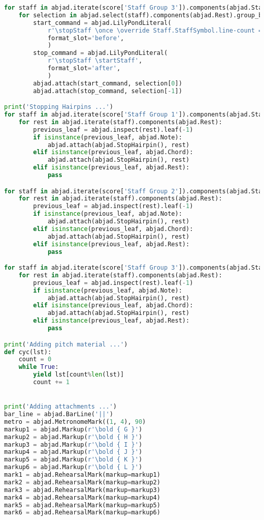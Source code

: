 \begin{lstlisting}[language=Python, caption=Tianshu Segment\_II]
for staff in abjad.iterate(score['Staff Group 3']).components(abjad.Staff):
    for selection in abjad.select(staff).components(abjad.Rest).group_by_contiguity():
        start_command = abjad.LilyPondLiteral(
            r'\stopStaff \once \override Staff.StaffSymbol.line-count = #1 \startStaff',
            format_slot='before',
            )
        stop_command = abjad.LilyPondLiteral(
            r'\stopStaff \startStaff',
            format_slot='after',
            )
        abjad.attach(start_command, selection[0])
        abjad.attach(stop_command, selection[-1])

print('Stopping Hairpins ...')
for staff in abjad.iterate(score['Staff Group 1']).components(abjad.Staff):
    for rest in abjad.iterate(staff).components(abjad.Rest):
        previous_leaf = abjad.inspect(rest).leaf(-1)
        if isinstance(previous_leaf, abjad.Note):
            abjad.attach(abjad.StopHairpin(), rest)
        elif isinstance(previous_leaf, abjad.Chord):
            abjad.attach(abjad.StopHairpin(), rest)
        elif isinstance(previous_leaf, abjad.Rest):
            pass

for staff in abjad.iterate(score['Staff Group 2']).components(abjad.Staff):
    for rest in abjad.iterate(staff).components(abjad.Rest):
        previous_leaf = abjad.inspect(rest).leaf(-1)
        if isinstance(previous_leaf, abjad.Note):
            abjad.attach(abjad.StopHairpin(), rest)
        elif isinstance(previous_leaf, abjad.Chord):
            abjad.attach(abjad.StopHairpin(), rest)
        elif isinstance(previous_leaf, abjad.Rest):
            pass

for staff in abjad.iterate(score['Staff Group 3']).components(abjad.Staff):
    for rest in abjad.iterate(staff).components(abjad.Rest):
        previous_leaf = abjad.inspect(rest).leaf(-1)
        if isinstance(previous_leaf, abjad.Note):
            abjad.attach(abjad.StopHairpin(), rest)
        elif isinstance(previous_leaf, abjad.Chord):
            abjad.attach(abjad.StopHairpin(), rest)
        elif isinstance(previous_leaf, abjad.Rest):
            pass

print('Adding pitch material ...')
def cyc(lst):
    count = 0
    while True:
        yield lst[count%len(lst)]
        count += 1


print('Adding attachments ...')
bar_line = abjad.BarLine('||')
metro = abjad.MetronomeMark((1, 4), 90)
markup1 = abjad.Markup(r'\bold { G }')
markup2 = abjad.Markup(r'\bold { H }')
markup3 = abjad.Markup(r'\bold { I }')
markup4 = abjad.Markup(r'\bold { J }')
markup5 = abjad.Markup(r'\bold { K }')
markup6 = abjad.Markup(r'\bold { L }')
mark1 = abjad.RehearsalMark(markup=markup1)
mark2 = abjad.RehearsalMark(markup=markup2)
mark3 = abjad.RehearsalMark(markup=markup3)
mark4 = abjad.RehearsalMark(markup=markup4)
mark5 = abjad.RehearsalMark(markup=markup5)
mark6 = abjad.RehearsalMark(markup=markup6)


\end{lstlisting}
